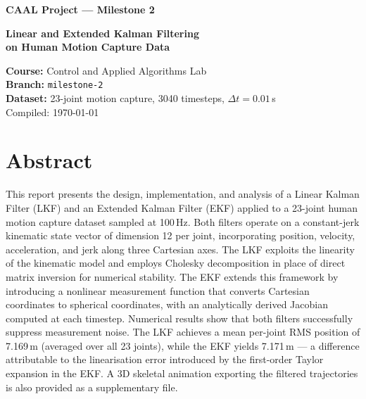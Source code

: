 \documentclass[12pt, a4paper]{article}
\begin{document}
\begin{titlepage}
\centering
\vspace*{2cm}
{\LARGE\bfseries CAAL Project — Milestone 2\par}
\vspace{0.4cm}
{\large\bfseries Linear and Extended Kalman Filtering\\[0.2em]
on Human Motion Capture Data\par}
\vspace{1.5cm}
{\normalsize
\textbf{Course:} Control and Applied Algorithms Lab\\[0.4em]
\textbf{Branch:} \texttt{milestone-2}\\[0.4em]
\textbf{Dataset:} 23-joint motion capture, 3040 timesteps, $\Delta t = 0.01\,$s\\[1.5cm]
}
\vfill
{\small Compiled: \today}
\end{titlepage}

\tableofcontents
\newpage

\section{Abstract}

This report presents the design, implementation, and analysis of a Linear Kalman Filter (LKF) and an Extended Kalman Filter (EKF) applied to a 23-joint human motion capture dataset sampled at 100\,Hz. Both filters operate on a constant-jerk kinematic state vector of dimension 12 per joint, incorporating position, velocity, acceleration, and jerk along three Cartesian axes. The LKF exploits the linearity of the kinematic model and employs Cholesky decomposition in place of direct matrix inversion for numerical stability. The EKF extends this framework by introducing a nonlinear measurement function that converts Cartesian coordinates to spherical coordinates, with an analytically derived Jacobian computed at each timestep. Numerical results show that both filters successfully suppress measurement noise. The LKF achieves a mean per-joint RMS position of 7.169\,m (averaged over all 23 joints), while the EKF yields 7.171\,m — a difference attributable to the linearisation error introduced by the first-order Taylor expansion in the EKF. A 3D skeletal animation exporting the filtered trajectories is also provided as a supplementary file.
\end{document}
